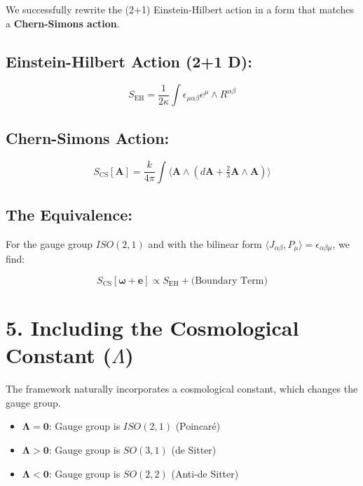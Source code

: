 \documentclass[a0,portrait]{a0poster}
\begin{document}
\begin{multicols}{2}
We successfully rewrite the (2+1) Einstein-Hilbert action in a form that matches a \textbf{Chern-Simons action}.

\subsection*{Einstein-Hilbert Action (2+1 D):}
\begin{equation*}
    S_{\text{EH}} = \frac{1}{2\kappa} \int \epsilon_{\mu\alpha\beta} e^\mu \wedge R^{\alpha\beta}
\end{equation*}

\subsection*{Chern-Simons Action:}
\begin{equation*}
    S_{\text{CS}}[\mathbf{A}] = \frac{k}{4\pi} \int \langle \mathbf{A} \wedge (d\mathbf{A} + \tfrac{2}{3} \mathbf{A} \wedge \mathbf{A}) \rangle
\end{equation*}

\subsection*{The Equivalence:}
For the gauge group $ISO(2,1)$ and with the bilinear form $\langle J_{\alpha\beta}, P_\mu \rangle = \epsilon_{\alpha\beta\mu}$, we find:

\begin{equation*}
    S_{\text{CS}}[\boldsymbol{\omega} + \mathbf{e}] \propto S_{\text{EH}} + \text{(Boundary Term)}
\end{equation*}

\centering
{}

\section*{5. Including the Cosmological Constant ($\Lambda$)}

The framework naturally incorporates a cosmological constant, which changes the gauge group.

\begin{itemize}
    \item $\mathbf{\Lambda = 0}$: Gauge group is $ISO(2,1)$ (Poincaré)
    \item $\mathbf{\Lambda > 0}$: Gauge group is $SO(3,1)$ (de Sitter)  
    \item $\mathbf{\Lambda < 0}$: Gauge group is $SO(2,2)$ (Anti-de Sitter)
\end{itemize}


\end{multicols}
\end{document}
